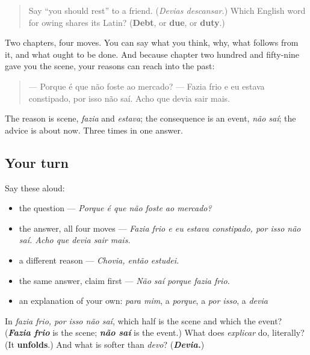 \label{lesson:PT-C262-revisao-explicacao}



\begin{quote}
Say \textquotedblleft{}you should rest\textquotedblright{} to a friend. (\emph{Devias descansar.}) Which English word for owing shares its Latin? (\textbf{Debt}, or \textbf{due}, or \textbf{duty}.)
\end{quote}

\begin{grammarlens}[title={What you've built}]
Two chapters, four moves. You can say what you think, why, what follows from it, and what ought to be done. And because chapter two hundred and fifty-nine gave you the scene, your reasons can reach into the past:

\begin{quote}
— Porque é que não foste ao mercado? — Fazia frio e eu estava constipado, por isso não saí. Acho que devia sair mais.
\end{quote}

The reason is scene, \emph{fazia} and \emph{estava}; the consequence is an event, \emph{não saí}; the advice is about now. Three times in one answer.
\end{grammarlens}

\subsection*{Your turn}
Say these aloud:

\begin{itemize}
\raggedright
  \item the question — \emph{Porque é que não foste ao mercado?}
  \item the answer, all four moves — \emph{Fazia frio e eu estava constipado, por isso não saí. Acho que devia sair mais.}
  \item a different reason — \emph{Chovia, então estudei.}
  \item the same answer, claim first — \emph{Não saí porque fazia frio.}
  \item an explanation of your own: \emph{para mim}, a \emph{porque}, a \emph{por isso}, a \emph{devia}
\end{itemize}

\begin{tcolorbox}[breakable,colback=teal!4,colframe=teal!35!black,title={Before you move on}]
In \emph{fazia frio, por isso não saí}, which half is the scene and which the event? (\emph{\textbf{Fazia frio}} is the scene; \emph{\textbf{não saí}} is the event.) What does \emph{explicar} do, literally? (It \textbf{unfolds}.) And what is softer than \emph{devo}? (\emph{\textbf{Devia.}})
\end{tcolorbox}
